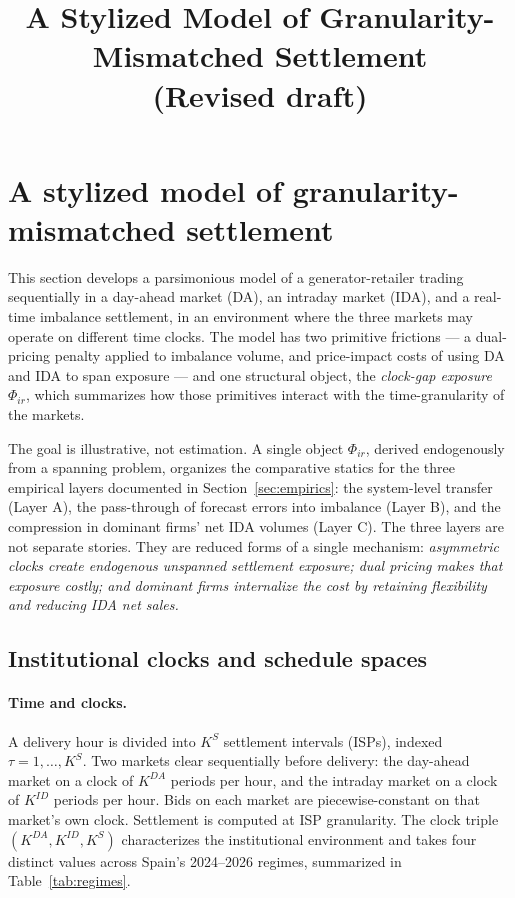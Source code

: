 \documentclass[11pt]{article}
\title{A Stylized Model of Granularity-Mismatched Settlement \\ \large (Revised draft)}
\author{}
\date{}
\begin{document}
\maketitle

\section{A stylized model of granularity-mismatched settlement}
\label{sec:model}

This section develops a parsimonious model of a generator-retailer trading sequentially in a day-ahead market (DA), an intraday market (IDA), and a real-time imbalance settlement, in an environment where the three markets may operate on different time clocks. The model has two primitive frictions --- a dual-pricing penalty applied to imbalance volume, and price-impact costs of using DA and IDA to span exposure --- and one structural object, the \emph{clock-gap exposure} $\Phi_{ir}$, which summarizes how those primitives interact with the time-granularity of the markets.

The goal is illustrative, not estimation. A single object $\Phi_{ir}$, derived endogenously from a spanning problem, organizes the comparative statics for the three empirical layers documented in Section~\ref{sec:empirics}: the system-level transfer (Layer A), the pass-through of forecast errors into imbalance (Layer B), and the compression in dominant firms' net IDA volumes (Layer C). The three layers are not separate stories. They are reduced forms of a single mechanism: \emph{asymmetric clocks create endogenous unspanned settlement exposure; dual pricing makes that exposure costly; and dominant firms internalize the cost by retaining flexibility and reducing IDA net sales.}

\subsection{Institutional clocks and schedule spaces}
\label{sec:model-clocks}

\paragraph{Time and clocks.} A delivery hour is divided into $K^{S}$ settlement intervals (ISPs), indexed $\tau = 1, \ldots, K^{S}$. Two markets clear sequentially before delivery: the day-ahead market on a clock of $K^{DA}$ periods per hour, and the intraday market on a clock of $K^{ID}$ periods per hour. Bids on each market are piecewise-constant on that market's own clock. Settlement is computed at ISP granularity. The clock triple $(K^{DA}, K^{ID}, K^{S})$ characterizes the institutional environment and takes four distinct values across Spain's 2024--2026 regimes, summarized in Table~\ref{tab:regimes}.
\end{document}
